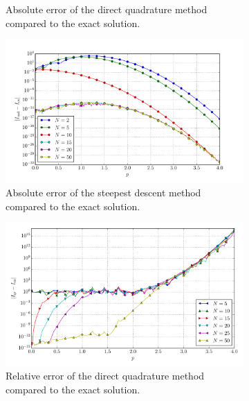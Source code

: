 \documentclass[a4paper,10pt]{article}
\begin{document}
\begin{figure}[ht!]
\begin{subfigure}[t]{0.5\linewidth}
    \caption{Absolute error of the direct quadrature method compared to the exact solution.}
    \label{fig:tp_1d_conv_p_11_9_err_qr}
  \end{subfigure}
  \begin{subfigure}[t]{0.5\linewidth}
    \includegraphics[width=\linewidth]{./plots/tp_1d_conv_p_11_9_err_nsd.pdf}
    \caption{Absolute error of the steepest descent method compared to the exact solution.}
    \label{fig:tp_1d_conv_p_11_9_err_nsd}
  \end{subfigure}
  \begin{subfigure}[t]{0.5\linewidth}
    \includegraphics[width=\linewidth]{./plots/tp_1d_conv_p_11_9_err_rel_qr.pdf}
    \caption{Relative error of the direct quadrature method compared to the exact solution.}
    \label{fig:tp_1d_conv_p_11_9_err_qr}
  \end{subfigure}
  \begin{subfigure}[t]{0.5\linewidth}

\end{subfigure}
\end{figure}
\end{document}
